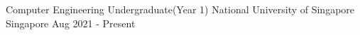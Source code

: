 

\begin{cventries}

	\cventry
	{Computer Engineering Undergraduate(Year 1)}
	{National University of Singapore}
	{Singapore}
	{Aug 2021 - Present}
	{ }

\end{cventries}
